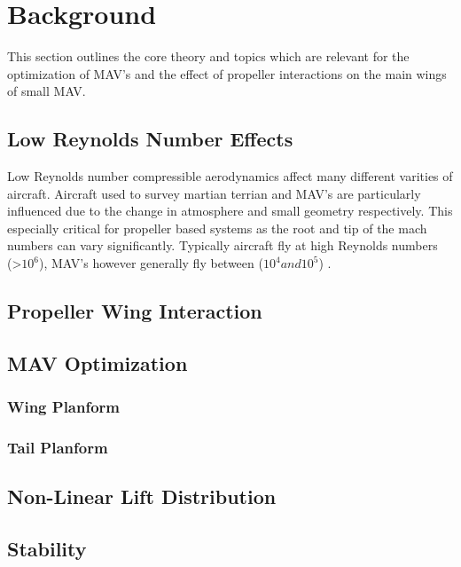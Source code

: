 \graphicspath{{./Figs/}}

\chapter{Background} 
This section outlines the core theory and topics which are relevant for the optimization of MAV's and the effect of propeller interactions on the main wings of small MAV. 




\section{Low Reynolds Number Effects }
\label{sec:LowReynolds}
Low Reynolds number compressible aerodynamics affect many different varities of aircraft. Aircraft used to survey martian terrian and MAV's are particularly influenced due to the change in atmosphere and small geometry respectively\cite{Munday2015}. This especially critical for propeller based systems as the root and tip of the mach numbers can vary significantly\cite{Munday2015}. Typically aircraft fly at high Reynolds numbers (>$10^{6}$), MAV's however generally fly between ($10^{4} and 10^{5}$) \cite{Winslow2018}.


\section{Propeller Wing Interaction}
\label{sec:Propeller Wing Interaction}

\section{MAV Optimization}
\label{sec:MAV Optimization}
\subsection{Wing Planform}

\subsection{Tail Planform}

\section{Non-Linear Lift Distribution}
\label{sec:Non-Linear Lift Distribution}



\section{Stability}


